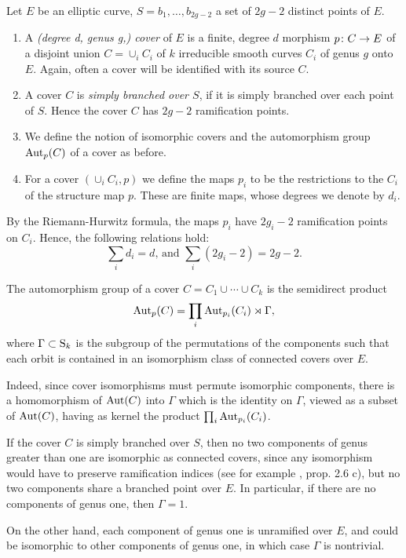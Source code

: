 \begin{defi} Let $E$ be an elliptic curve, $S={b_1,\dotsc,b_{2g-2}}$ a set of $2g-2$ distinct points of $E$.
 \begin{enumerate}
  \item A \emph{(degree d, genus g,) cover} of $E$ is a finite, degree $d$ morphism $p\colon C\to E$ of a disjoint union $C=\cup_i C_i$ of $k$ irreducible smooth curves $C_i$ of genus $g$ onto $E$. Again, often a cover will be identified with its source $C$.
  
  \item A cover $C$ is \emph{simply branched over $S$}, if it is simply branched over each point of $S$. Hence the cover $C$ has $2g-2$ ramification points.
  
  \item We define the notion of isomorphic covers and the automorphism group $\operatorname{Aut}_p(C)$ of a cover as before.

  \item For a cover $(\cup_i C_i,p)$ we define the maps $p_i$ to be the restrictions to the $C_i$ of the structure map $p$. These are finite maps, whose degrees we denote by $d_i$.
 \end{enumerate}
\end{defi}

\begin{rmk}
 By the Riemann-Hurwitz formula, the maps $p_i$ have $2g_i-2$ ramification points on $C_i$. Hence, the following relations hold:
 \[\sum_i d_i=d\text{, and }\sum_i (2g_i-2)=2g-2.\]
\end{rmk}

\begin{rmk}
 The automorphism group of a cover $C=C_1 \cup \dotsb \cup C_k$ is the semidirect product \[\operatorname{Aut}_p(C) = \prod_i \operatorname{Aut}_{p_i}(C_i) \rtimes \Gamma,\] where $\Gamma \subset \operatorname{S}_k$ is the subgroup of the permutations of the components such that each orbit is contained in an isomorphism class of connected covers over $E$.
 
 Indeed, since cover isomorphisms must permute isomorphic components, there is a homomorphism of $\operatorname{Aut}(C)$ into $\Gamma$ which is the identity on $\Gamma$, viewed as a subset of $\operatorname{Aut}(C)$, having as kernel the product $\prod_i \operatorname{Aut}_{p_i}(C_i)$.
 
 If the cover $C$ is simply branched over $S$, then no two components of genus greater than one are isomorphic as connected covers, since any isomorphism would have to preserve ramification indices (see for example \cite{Silverman2009}, prop. 2.6 c), but no two components share a branched point over $E$. In particular, if there are no components of genus one, then $\Gamma=1$.
 
 On the other hand, each component of genus one is unramified over $E$, and could be isomorphic to other components of genus one, in which case $\Gamma$ is nontrivial.
\end{rmk}

